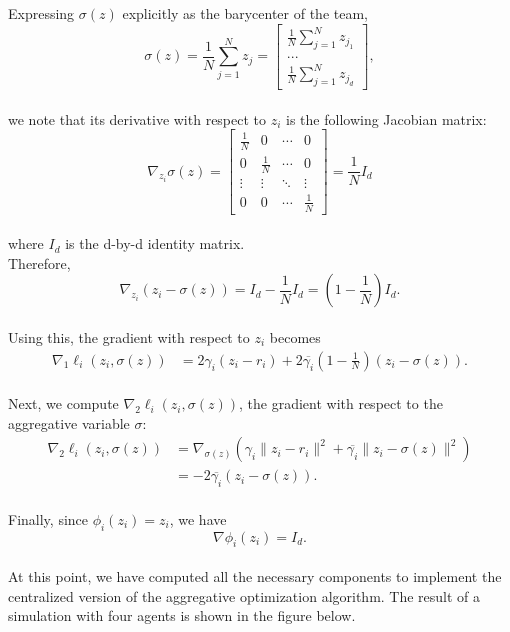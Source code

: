 \noindent Expressing \(\sigma(z)\) explicitly as the barycenter of the team,
\[
\sigma(z) = \frac{1}{N} \sum_{j=1}^N z_j = \begin{bmatrix}
\frac{1}{N} \sum_{j=1}^N z_{j_1} \\
... \\
\frac{1}{N} \sum_{j=1}^N z_{j_d}
\end{bmatrix},
\] \\
we note that its derivative with respect to \(z_i\) is the following Jacobian matrix:
\[
\nabla_{z_i} \sigma(z) =  \begin{bmatrix}
                            \frac{1}{N} & 0 & \cdots & 0 \\
                            0 & \frac{1}{N} & \cdots & 0 \\
                            \vdots & \vdots & \ddots & \vdots \\
                            0 & 0 & \cdots & \frac{1}{N}
                            \end{bmatrix}
                            = \frac{1}{N} I_d
\] \\
where \(I_d\) is the d-by-d identity matrix. \\
Therefore,
\[
\nabla_{z_i} (z_i - \sigma(z)) = I_d - \frac{1}{N} I_d = \left(1 - \frac{1}{N}\right) I_d.
\] \\
Using this, the gradient with respect to \(z_i\) becomes
\begin{align*}
\nabla_1 \ell_i(z_i, \sigma(z)) &= 2 \gamma_i (z_i - r_i) + 2 \overline{\gamma_i} \left(1 - \frac{1}{N}\right) (z_i - \sigma(z)) .
\end{align*}
\\
Next, we compute \(\nabla_2 \ell_i(z_i, \sigma(z))\), the gradient with respect to the aggregative variable \(\sigma\):
\begin{align*}
\nabla_2 \ell_i(z_i, \sigma(z)) &= \nabla_{\sigma(z)} \left( \gamma_i \| z_i - r_i \|^2 + \overline{\gamma_i} \| z_i - \sigma(z) \|^2 \right) \\
&= -2 \overline{\gamma_i} (z_i - \sigma(z)).
\end{align*}
\\
Finally, since \(\phi_i(z_i) = z_i\), we have
\[
\nabla \phi_i(z_i) = I_d.
\] \\
At this point, we have computed all the necessary components to implement the centralized version of the aggregative optimization algorithm. The result of a simulation with four agents is shown in the figure below.

